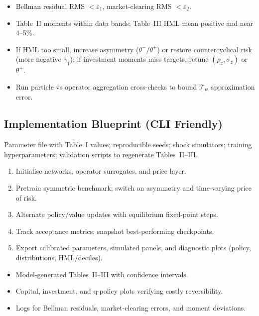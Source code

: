 \documentclass[11pt,a4paper]{article}
\numberwithin{equation}{section}
\begin{document}
\begin{diagnosticbox}[title={Acceptance Tests and Failure Modes}]
\begin{itemize}
  \item Bellman residual RMS $< \varepsilon_1$, market-clearing RMS $< \varepsilon_2$.
  \item Table~II moments within data bands; Table~III HML mean positive and near 4--5\%.
  \item If HML too small, increase asymmetry (\(\theta^- / \theta^+\)) or restore countercyclical risk (more negative \(\gamma_1\)); if investment moments miss targets, retune $(\rho_z, \sigma_z)$ or $\theta^+$.
  \item Run particle vs operator aggregation cross-checks to bound $\mathcal T_{\psi}$ approximation error.
\end{itemize}
\end{diagnosticbox}

\subsection{Implementation Blueprint (CLI Friendly)}
\begin{notebox}[title={Inputs}]
Parameter file with Table~I values; reproducible seeds; shock simulators; training hyperparameters; validation scripts to regenerate Tables~II--III.
\end{notebox}

\begin{notebox}[title={Process Flow}]
\begin{enumerate}[label=\arabic*.]
  \item Initialise networks, operator surrogates, and price layer.
  \item Pretrain symmetric benchmark; switch on asymmetry and time-varying price of risk.
  \item Alternate policy/value updates with equilibrium fixed-point steps.
  \item Track acceptance metrics; snapshot best-performing checkpoints.
  \item Export calibrated parameters, simulated panels, and diagnostic plots (policy, distributions, HML/deciles).
\end{enumerate}
\end{notebox}

\begin{notebox}[title={Outputs and Acceptance Tests}]
\begin{itemize}
  \item Model-generated Tables~II--III with confidence intervals.
  \item Capital, investment, and q-policy plots verifying costly reversibility.
  \item Logs for Bellman residuals, market-clearing errors, and moment deviations.
\end{itemize}
\end{notebox}
\end{document}
